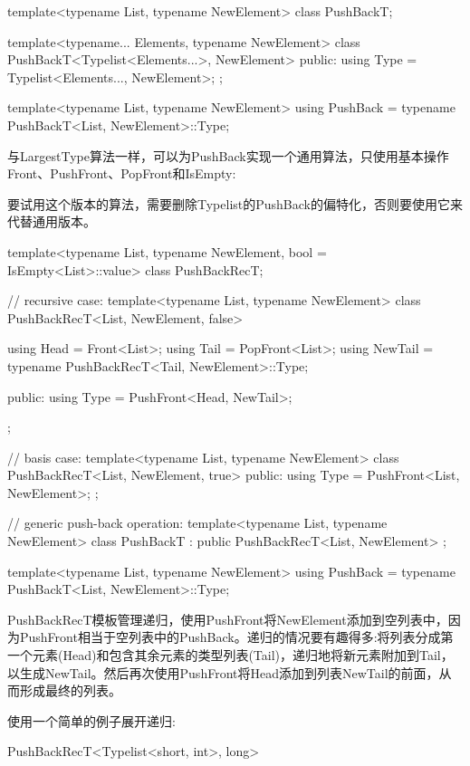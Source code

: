 \begin{cpp}
template<typename List, typename NewElement>
class PushBackT;

template<typename... Elements, typename NewElement>
class PushBackT<Typelist<Elements...>, NewElement>
{
	public:
	using Type = Typelist<Elements..., NewElement>;
};

template<typename List, typename NewElement>
using PushBack = typename PushBackT<List, NewElement>::Type;
\end{cpp}

与LargestType算法一样，可以为PushBack实现一个通用算法，只使用基本操作Front、PushFront、PopFront和IsEmpty:

\begin{notice}
要试用这个版本的算法，需要删除Typelist的PushBack的偏特化，否则要使用它来代替通用版本。
\end{notice}

\begin{cpp}
template<typename List, typename NewElement, bool = IsEmpty<List>::value>
class PushBackRecT;

// recursive case:
template<typename List, typename NewElement>
class PushBackRecT<List, NewElement, false>
{
	using Head = Front<List>;
	using Tail = PopFront<List>;
	using NewTail = typename PushBackRecT<Tail, NewElement>::Type;
	
	public:
	using Type = PushFront<Head, NewTail>;
};

// basis case:
template<typename List, typename NewElement>
class PushBackRecT<List, NewElement, true>
{
	public:
	using Type = PushFront<List, NewElement>;
};

// generic push-back operation:
template<typename List, typename NewElement>
class PushBackT : public PushBackRecT<List, NewElement> { };

template<typename List, typename NewElement>
using PushBack = typename PushBackT<List, NewElement>::Type;
\end{cpp}

PushBackRecT模板管理递归，使用PushFront将NewElement添加到空列表中，因为PushFront相当于空列表中的PushBack。递归的情况要有趣得多:将列表分成第一个元素(Head)和包含其余元素的类型列表(Tail)，递归地将新元素附加到Tail，以生成NewTail。然后再次使用PushFront将Head添加到列表NewTail的前面，从而形成最终的列表。

使用一个简单的例子展开递归:

\begin{cpp}
PushBackRecT<Typelist<short, int>, long>
\end{cpp}

